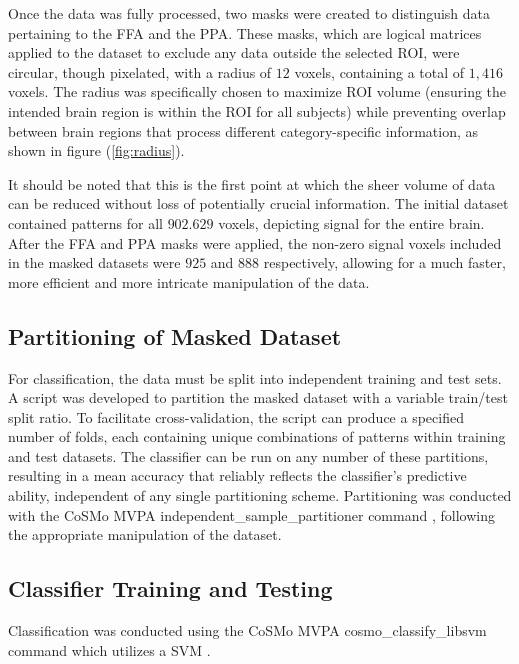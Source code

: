 Once the data was fully processed, two masks were created to distinguish data pertaining to the \gls{FFA} and the \gls{PPA}. These masks, which are logical matrices applied to the dataset to exclude any data outside the selected \gls{ROI}, were circular, though pixelated, with a radius of $12$ voxels, containing a total of $1,416$ voxels. The radius was specifically chosen to maximize \gls{ROI} volume (ensuring the intended brain region is within the \gls{ROI} for all subjects) while preventing overlap between brain regions that process different category-specific information, as shown in figure (\autoref{fig:radius}).

It should be noted that this is the first point at which the sheer volume of data can be reduced without loss of potentially crucial information. The initial dataset contained patterns for all $902.629$ voxels, depicting signal for the entire brain. After the \gls{FFA} and \gls{PPA} masks were applied, the non-zero signal voxels included in the masked datasets were $925$ and $888$ respectively, allowing for a much faster, more efficient and more intricate manipulation of the data.

\subsection{Partitioning of Masked Dataset}

For classification, the data must be split into independent training and test sets. A script was developed to partition the masked dataset with a variable train/test split ratio. To facilitate cross-validation, the script can produce a specified number of folds, each containing unique combinations of patterns within training and test datasets. The classifier can be run on any number of these partitions, resulting in a mean accuracy that reliably reflects the classifier's predictive ability, independent of any single partitioning scheme. Partitioning was conducted with the CoSMo \gls{MVPA} independent\_sample\_partitioner command \cite{cosmo1}, following the appropriate manipulation of the dataset.

\subsection{Classifier Training and Testing}

Classification was conducted using the CoSMo \gls{MVPA} cosmo\_classify\_libsvm command \cite{cosmo2} which utilizes a \gls{SVM} \cite{Cortes1995}.


